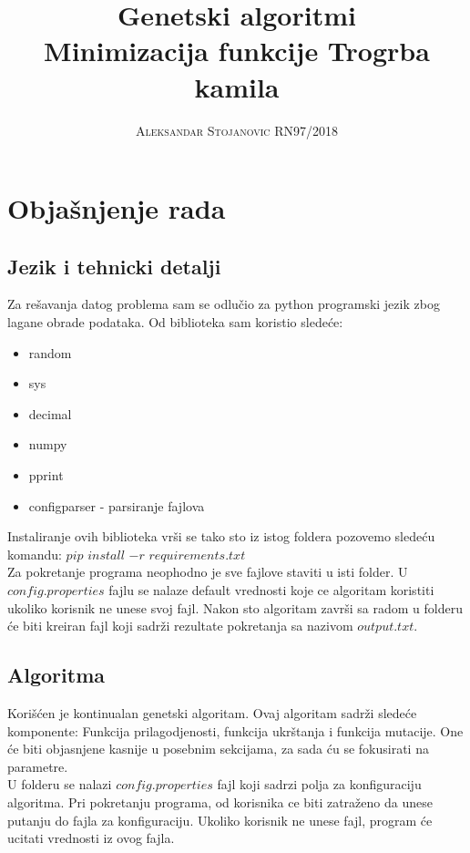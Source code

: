 \documentclass[a4paper,11pt]{book}
\title{\Huge \textbf{Genetski algoritmi} \\ \huge Minimizacija funkcije Trogrba kamila}
\author{\textsc{Aleksandar Stojanovic RN97/2018}}
\begin{document}
\frontmatter
\maketitle

\mainmatter

\chapter{Objašnjenje rada}

\section{Jezik i tehnicki detalji}
Za rešavanja datog problema sam se odlučio za python programski jezik zbog lagane obrade podataka. Od biblioteka sam koristio sledeće:

\begin{itemize}
  \item random
  \item sys
  \item decimal
  \item numpy
  \item pprint
  \item configparser - parsiranje fajlova
\end{itemize}

Instaliranje ovih biblioteka vrši se tako sto iz istog foldera pozovemo sledeću komandu: $pip$ $install$ $-r$ $requirements.txt$ \\
Za pokretanje programa neophodno je sve fajlove staviti u isti folder. U $config.properties$ fajlu se nalaze default vrednosti koje ce algoritam koristiti ukoliko korisnik ne unese svoj fajl. Nakon sto algoritam završi sa radom u folderu će biti kreiran fajl koji sadrži rezultate pokretanja sa nazivom $output.txt$.

\section{Algoritma}

Korišćen je kontinualan genetski algoritam. Ovaj algoritam sadrži sledeće komponente: Funkcija prilagodjenosti, funkcija ukrštanja i funkcija mutacije. One će biti objasnjene kasnije u posebnim sekcijama, za sada ću se fokusirati na parametre.\\

U folderu se nalazi $config.properties$ fajl koji sadrzi polja za konfiguraciju algoritma. Pri pokretanju programa, od korisnika ce biti zatraženo da unese putanju do fajla za konfiguraciju. Ukoliko korisnik ne unese fajl, program će ucitati vrednosti iz ovog fajla. \\
\end{document}

